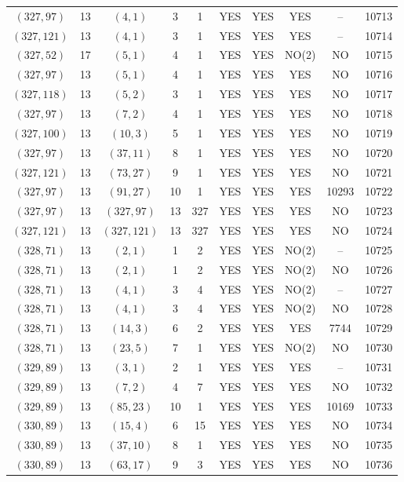 \begin{longtable}{|c|c|c|c|c|c|c|c|c|c|}
$(327, 97)$ & 13 & $(4, 1)$ & 3 & 1 & YES & YES & YES & -- & 10713\\
$(327, 121)$ & 13 & $(4, 1)$ & 3 & 1 & YES & YES & YES & -- & 10714\\
$(327, 52)$ & 17 & $(5, 1)$ & 4 & 1 & YES & YES & NO(2) & NO & 10715\\
$(327, 97)$ & 13 & $(5, 1)$ & 4 & 1 & YES & YES & YES & NO & 10716\\
$(327, 118)$ & 13 & $(5, 2)$ & 3 & 1 & YES & YES & YES & NO & 10717\\
$(327, 97)$ & 13 & $(7, 2)$ & 4 & 1 & YES & YES & YES & NO & 10718\\
$(327, 100)$ & 13 & $(10, 3)$ & 5 & 1 & YES & YES & YES & NO & 10719\\
$(327, 97)$ & 13 & $(37, 11)$ & 8 & 1 & YES & YES & YES & NO & 10720\\
$(327, 121)$ & 13 & $(73, 27)$ & 9 & 1 & YES & YES & YES & NO & 10721\\
$(327, 97)$ & 13 & $(91, 27)$ & 10 & 1 & YES & YES & YES & 10293 & 10722\\
$(327, 97)$ & 13 & $(327, 97)$ & 13 & 327 & YES & YES & YES & NO & 10723\\
$(327, 121)$ & 13 & $(327, 121)$ & 13 & 327 & YES & YES & YES & NO & 10724\\
$(328, 71)$ & 13 & $(2, 1)$ & 1 & 2 & YES & YES & NO(2) & -- & 10725\\
$(328, 71)$ & 13 & $(2, 1)$ & 1 & 2 & YES & YES & NO(2) & NO & 10726\\
$(328, 71)$ & 13 & $(4, 1)$ & 3 & 4 & YES & YES & NO(2) & -- & 10727\\
$(328, 71)$ & 13 & $(4, 1)$ & 3 & 4 & YES & YES & NO(2) & NO & 10728\\
$(328, 71)$ & 13 & $(14, 3)$ & 6 & 2 & YES & YES & YES & 7744 & 10729\\
$(328, 71)$ & 13 & $(23, 5)$ & 7 & 1 & YES & YES & NO(2) & NO & 10730\\
$(329, 89)$ & 13 & $(3, 1)$ & 2 & 1 & YES & YES & YES & -- & 10731\\
$(329, 89)$ & 13 & $(7, 2)$ & 4 & 7 & YES & YES & YES & NO & 10732\\
$(329, 89)$ & 13 & $(85, 23)$ & 10 & 1 & YES & YES & YES & 10169 & 10733\\
$(330, 89)$ & 13 & $(15, 4)$ & 6 & 15 & YES & YES & YES & NO & 10734\\
$(330, 89)$ & 13 & $(37, 10)$ & 8 & 1 & YES & YES & YES & NO & 10735\\
$(330, 89)$ & 13 & $(63, 17)$ & 9 & 3 & YES & YES & YES & NO & 10736\\

\end{longtable}
